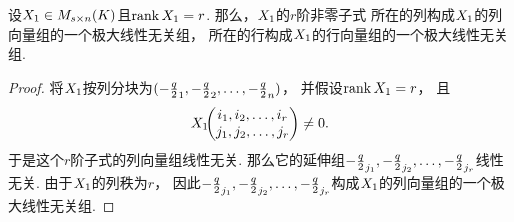 \begin{corollary}
设\(X_1\in M_{s \times n}(K)\)且\(\rank X_1=r\).
那么，\(X_1\)的\(r\)阶非零子式
所在的列构成\(X_1\)的列向量组的一个极大线性无关组，
所在的行构成\(X_1\)的行向量组的一个极大线性无关组.
\begin{proof}
将\(X_1\)按列分块为\((-\frac{q}{2}_1,-\frac{q}{2}_2,\dotsc,-\frac{q}{2}_n)\)，
并假设\(\rank X_1 = r\)，
且\[
	X_1\kern-3.8pt\begin{pmatrix}
		i_1,i_2,\dotsc,i_r \\
		j_1,j_2,\dotsc,j_r
	\end{pmatrix} \neq 0.
\]
于是这个\(r\)阶子式的列向量组线性无关.
那么它的延伸组\(-\frac{q}{2}_{j_1},-\frac{q}{2}_{j_2},\dotsc,-\frac{q}{2}_{j_r}\)线性无关.
由于\(X_1\)的列秩为\(r\)，
因此\(-\frac{q}{2}_{j_1},-\frac{q}{2}_{j_2},\dotsc,-\frac{q}{2}_{j_r}\)构成\(X_1\)的列向量组的一个极大线性无关组.
\end{proof}
\end{corollary}
